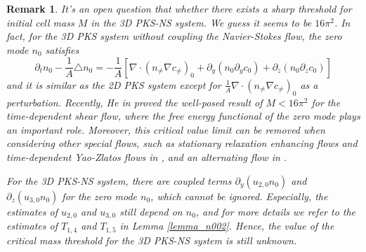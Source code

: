\documentclass[12pt, reqno]{amsart}
\newtheorem{remark}{Remark}[section]
\numberwithin{equation}{section}
\begin{document}
\begin{remark}
	It's an open question that  whether there exists a sharp 
	threshold for initial cell mass $M$ in the 3D PKS-NS system.
	We guess it seems to be $16\pi^2$.
	In fact, for the 3D PKS system without coupling the Navier-Stokes flow, the zero mode $n_0$ satisfies
$$\partial_t n_{0}-\frac{1}{A}\triangle n_{0}=-\frac{1}{A}\left[\nabla\cdot(n_{\neq}\nabla c_{\neq})_{0}+\partial_{y}(n_{0}\partial_{y}c_{0})+\partial_{z}(n_{0}\partial_{z}c_{0}) \right]$$
	and it is similar as the 2D  PKS system except for $\frac{1}{A}\nabla\cdot(n_{\neq}\nabla c_{\neq})_{0}$ as a perturbation.
	Recently, He in \cite{he24-2} proved the well-posed result of  $M<16\pi^2$  for the time-dependent shear flow, where the free energy functional of the zero mode plays an important role. Moreover, this critical value limit can be removed when considering other special flows, such as stationary relaxation
	enhancing flows and time-dependent Yao-Zlatos flows in \cite{Kiselev1}, and an alternating flow in \cite{he24-1}.
	
	For the 3D PKS-NS system, there are coupled terms $\partial_{y}(u_{2,0}n_{0})$ and $\partial_{z}(u_{3,0}n_{0})$ for the zero mode $n_0$, which cannot be ignored. Especially, \textcolor[rgb]{0,0,0}{the estimates of $u_{2,0}$ and $u_{3,0}$ still depend} on $n_0$, and for more details we refer to the estimates of $T_{1,4}$ and $T_{1,5}$ in Lemma \ref{lemma_n002}.
	Hence, the value of the critical mass threshold for the 3D PKS-NS system is still unknown.
	
	
\end{remark}
\end{document}
